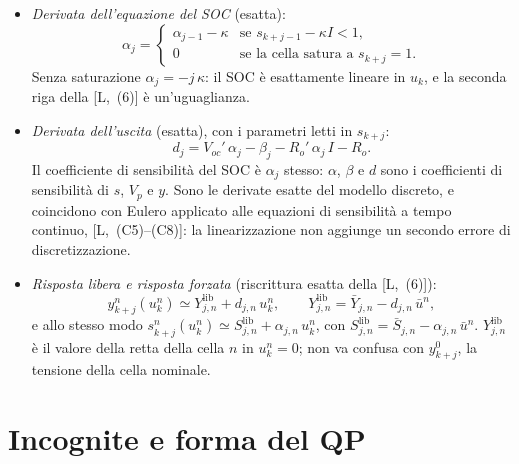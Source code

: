 \documentclass[11pt,a4paper]{article}
\newcommand{\Tc}{T_c}
\newcommand{\lib}{\mathrm{lib}}
\begin{document}
\begin{itemize}
        $\tau' = R_p'\,C_p + R_p\,C_p'$ e i parametri letti in $s_{k+j-1}$:
        \[
          \beta_j = \beta_{j-1} + \Tc\left(
             -\frac{\beta_{j-1}}{\tau}
             + \frac{V_{p,k+j-1}\,\tau'\,\alpha_{j-1}}{\tau^2}
             + \frac{1}{C_p}
             - \frac{I\,C_p'\,\alpha_{j-1}}{C_p^2}\right) .
          \tag*{[L,~(7)]}
        \]
  \item \emph{Derivata dell'equazione del SOC} (esatta):
        \[
          \alpha_j =
          \begin{cases}
            \alpha_{j-1} - \kappa & \text{se } s_{k+j-1} - \kappa I < 1 , \\
            0 & \text{se la cella satura a } s_{k+j} = 1 .
          \end{cases}
          \tag*{[L,~(8)]}
        \]
        Senza saturazione $\alpha_j = -j\,\kappa$: il SOC è esattamente lineare
        in $u_k$, e la seconda riga della [L,~(6)] è un'uguaglianza.
  \item \emph{Derivata dell'uscita} (esatta), con i parametri letti in
        $s_{k+j}$:
        \[
          d_j = V_{oc}'\,\alpha_j - \beta_j - R_o'\,\alpha_j\, I - R_o .
          \tag*{[L,~(9)]}
        \]
        Il coefficiente di sensibilità del SOC è $\alpha_j$ stesso: $\alpha$,
        $\beta$ e $d$ sono i coefficienti di sensibilità di $s$, $V_p$ e $y$.
        Sono le derivate esatte del modello discreto, e coincidono con Eulero
        applicato alle equazioni di sensibilità a tempo continuo,
        [L,~(C5)--(C8)]: la linearizzazione non aggiunge un secondo errore di
        discretizzazione.
  \item \emph{Risposta libera e risposta forzata} (riscrittura esatta della
        [L,~(6)]):
        \[
          y^n_{k+j}(u^n_k) \simeq Y^\lib_{j,n} + d_{j,n}\,u^n_k , \qquad
          Y^\lib_{j,n} = \bar Y_{j,n} - d_{j,n}\,\bar u^n ,
          \tag*{[L,~(10)]}
        \]
        e allo stesso modo $s^n_{k+j}(u^n_k) \simeq S^\lib_{j,n} + \alpha_{j,n}\,u^n_k$,
        con $S^\lib_{j,n} = \bar S_{j,n} - \alpha_{j,n}\,\bar u^n$. $Y^\lib_{j,n}$ è
        il valore della retta della cella $n$ in $u^n_k = 0$; non va confusa
        con $y^0_{k+j}$, la tensione della cella nominale.
\end{itemize}

\section{Incognite e forma del QP}\label{sec:forma}
\end{document}
